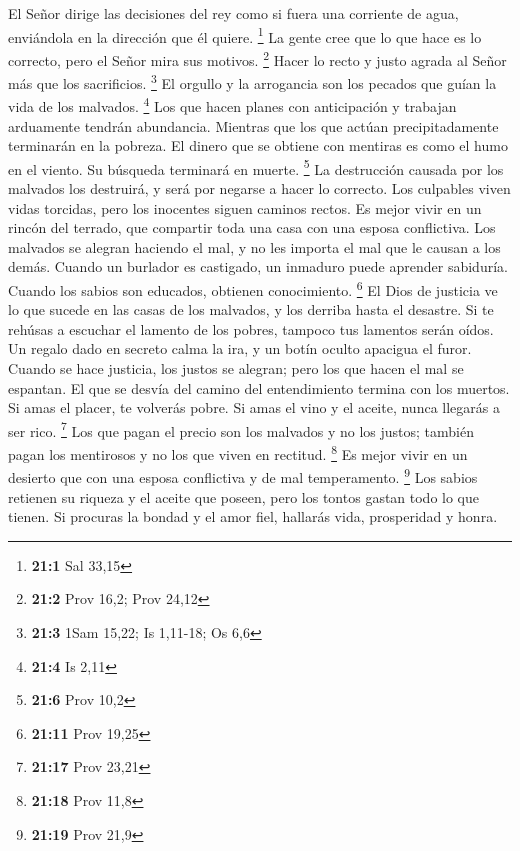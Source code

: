  El Señor dirige las decisiones del rey como si fuera una
corriente de agua, enviándola en la dirección que él quiere. \footnote{\textbf{21:1}
  Sal 33,15}  La gente cree que lo que hace es lo correcto,
pero el Señor mira sus motivos. \footnote{\textbf{21:2} Prov 16,2; Prov
  24,12}  Hacer lo recto y justo agrada al Señor más que los
sacrificios. \footnote{\textbf{21:3} 1Sam 15,22; Is 1,11-18; Os 6,6}
 El orgullo y la arrogancia son los pecados que guían la
vida de los malvados. \footnote{\textbf{21:4} Is 2,11}  Los
que hacen planes con anticipación y trabajan arduamente tendrán
abundancia. Mientras que los que actúan precipitadamente terminarán en
la pobreza.  El dinero que se obtiene con mentiras es como
el humo en el viento. Su búsqueda terminará en muerte. \footnote{\textbf{21:6}
  Prov 10,2}  La destrucción causada por los malvados los
destruirá, y será por negarse a hacer lo correcto.  Los
culpables viven vidas torcidas, pero los inocentes siguen caminos
rectos.  Es mejor vivir en un rincón del terrado, que
compartir toda una casa con una esposa conflictiva.  Los
malvados se alegran haciendo el mal, y no les importa el mal que le
causan a los demás.  Cuando un burlador es castigado, un
inmaduro puede aprender sabiduría. Cuando los sabios son educados,
obtienen conocimiento. \footnote{\textbf{21:11} Prov 19,25}
 El Dios de justicia ve lo que sucede en las casas de los
malvados, y los derriba hasta el desastre.  Si te rehúsas a
escuchar el lamento de los pobres, tampoco tus lamentos serán oídos.
 Un regalo dado en secreto calma la ira, y un botín oculto
apacigua el furor.  Cuando se hace justicia, los justos se
alegran; pero los que hacen el mal se espantan.  El que se
desvía del camino del entendimiento termina con los muertos.
 Si amas el placer, te volverás pobre. Si amas el vino y el
aceite, nunca llegarás a ser rico. \footnote{\textbf{21:17} Prov 23,21}
 Los que pagan el precio son los malvados y no los justos;
también pagan los mentirosos y no los que viven en rectitud. \footnote{\textbf{21:18}
  Prov 11,8}  Es mejor vivir en un desierto que con una
esposa conflictiva y de mal temperamento. \footnote{\textbf{21:19} Prov
  21,9}  Los sabios retienen su riqueza y el aceite que
poseen, pero los tontos gastan todo lo que tienen.  Si
procuras la bondad y el amor fiel, hallarás vida, prosperidad y honra.
